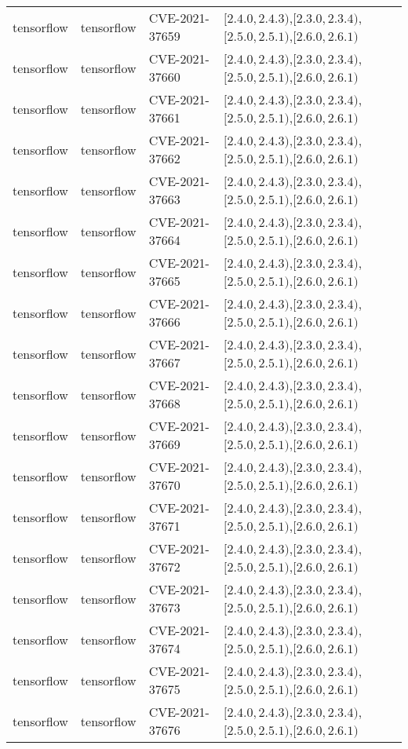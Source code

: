 \begin{tabular}{llll}
tensorflow & tensorflow & CVE-2021-37659 & $[2.4.0,2.4.3)$,$[2.3.0,2.3.4)$,$[2.5.0,2.5.1)$,$[2.6.0,2.6.1)$ \\
tensorflow & tensorflow & CVE-2021-37660 & $[2.4.0,2.4.3)$,$[2.3.0,2.3.4)$,$[2.5.0,2.5.1)$,$[2.6.0,2.6.1)$ \\
tensorflow & tensorflow & CVE-2021-37661 & $[2.4.0,2.4.3)$,$[2.3.0,2.3.4)$,$[2.5.0,2.5.1)$,$[2.6.0,2.6.1)$ \\
tensorflow & tensorflow & CVE-2021-37662 & $[2.4.0,2.4.3)$,$[2.3.0,2.3.4)$,$[2.5.0,2.5.1)$,$[2.6.0,2.6.1)$ \\
tensorflow & tensorflow & CVE-2021-37663 & $[2.4.0,2.4.3)$,$[2.3.0,2.3.4)$,$[2.5.0,2.5.1)$,$[2.6.0,2.6.1)$ \\
tensorflow & tensorflow & CVE-2021-37664 & $[2.4.0,2.4.3)$,$[2.3.0,2.3.4)$,$[2.5.0,2.5.1)$,$[2.6.0,2.6.1)$ \\
tensorflow & tensorflow & CVE-2021-37665 & $[2.4.0,2.4.3)$,$[2.3.0,2.3.4)$,$[2.5.0,2.5.1)$,$[2.6.0,2.6.1)$ \\
tensorflow & tensorflow & CVE-2021-37666 & $[2.4.0,2.4.3)$,$[2.3.0,2.3.4)$,$[2.5.0,2.5.1)$,$[2.6.0,2.6.1)$ \\
tensorflow & tensorflow & CVE-2021-37667 & $[2.4.0,2.4.3)$,$[2.3.0,2.3.4)$,$[2.5.0,2.5.1)$,$[2.6.0,2.6.1)$ \\
tensorflow & tensorflow & CVE-2021-37668 & $[2.4.0,2.4.3)$,$[2.3.0,2.3.4)$,$[2.5.0,2.5.1)$,$[2.6.0,2.6.1)$ \\
tensorflow & tensorflow & CVE-2021-37669 & $[2.4.0,2.4.3)$,$[2.3.0,2.3.4)$,$[2.5.0,2.5.1)$,$[2.6.0,2.6.1)$ \\
tensorflow & tensorflow & CVE-2021-37670 & $[2.4.0,2.4.3)$,$[2.3.0,2.3.4)$,$[2.5.0,2.5.1)$,$[2.6.0,2.6.1)$ \\
tensorflow & tensorflow & CVE-2021-37671 & $[2.4.0,2.4.3)$,$[2.3.0,2.3.4)$,$[2.5.0,2.5.1)$,$[2.6.0,2.6.1)$ \\
tensorflow & tensorflow & CVE-2021-37672 & $[2.4.0,2.4.3)$,$[2.3.0,2.3.4)$,$[2.5.0,2.5.1)$,$[2.6.0,2.6.1)$ \\
tensorflow & tensorflow & CVE-2021-37673 & $[2.4.0,2.4.3)$,$[2.3.0,2.3.4)$,$[2.5.0,2.5.1)$,$[2.6.0,2.6.1)$ \\
tensorflow & tensorflow & CVE-2021-37674 & $[2.4.0,2.4.3)$,$[2.3.0,2.3.4)$,$[2.5.0,2.5.1)$,$[2.6.0,2.6.1)$ \\
tensorflow & tensorflow & CVE-2021-37675 & $[2.4.0,2.4.3)$,$[2.3.0,2.3.4)$,$[2.5.0,2.5.1)$,$[2.6.0,2.6.1)$ \\
tensorflow & tensorflow & CVE-2021-37676 & $[2.4.0,2.4.3)$,$[2.3.0,2.3.4)$,$[2.5.0,2.5.1)$,$[2.6.0,2.6.1)$ \\

\end{tabular}
